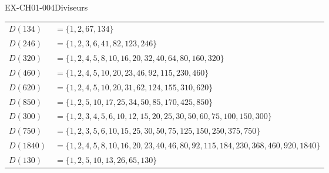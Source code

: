 \begin{exercice}{EX-CH01-004}{Diviseurs}
\medskip
{}%
{\def\arraystretch{1.2}
\begin{tabularx}{\linewidth}{lX}
$D(134)$  & $= \{1, 2, 67, 134\}$ \\
$D(246)$  & $= \{1, 2, 3, 6, 41, 82, 123, 246\}$ \\
$D(320)$  & $= \{1, 2, 4, 5, 8, 10, 16, 20, 32, 40, 64, 80, 160, 320\}$ \\
$D(460)$  & $= \{1, 2, 4, 5, 10, 20, 23, 46, 92, 115, 230, 460\}$ \\
$D(620)$  & $= \{1, 2, 4, 5, 10, 20, 31, 62, 124, 155, 310, 620\}$ \\
$D(850)$  & $= \{1, 2, 5, 10, 17, 25, 34, 50, 85, 170, 425, 850\}$ \\
$D(300)$  & $= \{1, 2, 3, 4, 5, 6, 10, 12, 15, 20, 25, 30, 50, 60, 75, 100, 150, 300\}$ \\
$D(750)$  & $= \{1, 2, 3, 5, 6, 10, 15, 25, 30, 50, 75, 125, 150, 250, 375, 750\}$ \\
$D(1840)$ & $= \{1, 2, 4, 5, 8, 10, 16, 20, 23, 40, 46, 80, 92, 115, 184, 230, 368, 460, 920, 1840\}$ \\
$D(130)$  & $= \{1, 2, 5, 10, 13, 26, 65, 130\}$ \\
\end{tabularx}
\def\arraystretch{1}}

\end{exercice}